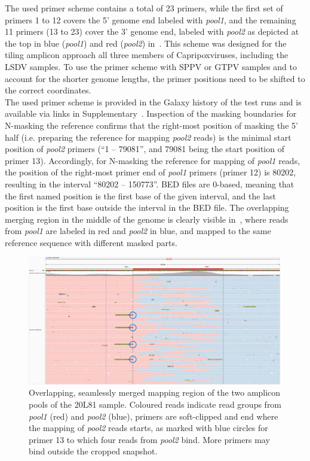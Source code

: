The used primer scheme contains a total of 23 primers, while the first set of primers 1 to 12 covers the 5' genome end labeled with \textit{pool1}, and the remaining 11 primers (13 to 23) cover the 3' genome end, labeled with \textit{pool2} as depicted at the top in blue (\textit{pool1}) and red (\textit{pool2}) in~. This scheme was designed for the tiling amplicon approach all three members of Capripoxviruses, including the \ac{LSDV} samples. To use the primer scheme with \ac{SPPV} or \ac{GTPV} samples and to account for the shorter genome lengths, the primer positions need to be shifted to the correct coordinates.\\
The used primer scheme is provided in the Galaxy history of the test runs and is available via links in Supplementary~. Inspection of the masking boundaries for N-masking the reference confirms that the right-most position of masking the 5' half (i.e. preparing the reference for mapping \textit{pool2} reads) is the minimal start position of \textit{pool2} primers (``1 -- 79081'', and 79081 being the start position of primer 13). Accordingly, for N-masking the reference for mapping of \textit{pool1} reads, the position of the right-most primer end of \textit{pool1} primers (primer 12) is 80202, resulting in the interval ``80202 -- 150773''. \ac{BED} files are 0-based, meaning that the first named position is the first base of the given interval, and the last position is the first base outside the interval in the \ac{BED} file. The overlapping merging region in the middle of the genome is clearly visible in~, where reads from \textit{pool1} are labeled in red and \textit{pool2} in blue, and mapped to the same reference sequence with different masked parts. 
\begin{figure}[ht!]
    \centering
    \hspace*{-24pt}
    \includegraphics[width=1.1\textwidth]{media/4-lsdv-alig-20L81-c.png}
    \caption[Overlapping reads region of LSDV mapping in 20L81 sample.]{Overlapping, seamlessly merged mapping region of the two amplicon pools of the 20L81 sample. Coloured reads indicate read groups from \textit{pool1} (red) and \textit{pool2} (blue), primers are soft-clipped and end where the mapping of \textit{pool2} reads starts, as marked with blue circles for primer 13 to which four reads from \textit{pool2} bind. More primers may bind outside the cropped snapshot.}
    \label{fig:4-lsdv-read-groups}
\end{figure}

